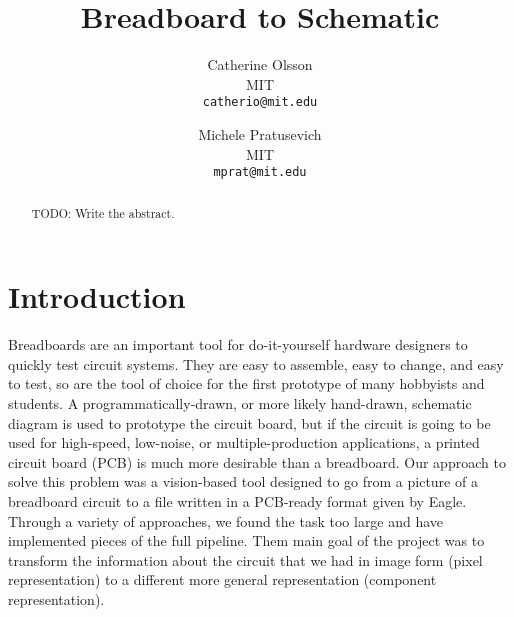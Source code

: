 \documentclass[10pt,twocolumn,letterpaper]{article}
\begin{document}
\title{Breadboard to Schematic}

\author{Catherine Olsson \\
MIT\\
{\tt\small catherio@mit.edu}
\and
Michele Pratusevich\\
MIT\\
{\tt\small mprat@mit.edu}
}

\maketitle
\thispagestyle{empty}

\begin{abstract}

TODO: Write the abstract.

\end{abstract}

\section{Introduction}

Breadboards are an important tool for do-it-yourself hardware designers to
quickly test circuit systems. They are easy to assemble, easy to change, and
easy to test, so are the tool of choice for the first prototype of many
hobbyists and students. A programmatically-drawn, or more likely hand-drawn,
schematic diagram is used to prototype the circuit board, but if the circuit is
going to be used for high-speed, low-noise, or multiple-production
applications, a printed circuit board (PCB) is much more desirable than a
breadboard. Our approach to solve this problem was a vision-based tool designed
to go from a picture of a breadboard circuit to a file written in a PCB-ready
format given by Eagle. Through a variety of approaches, we found the task too
large and have implemented pieces of the full pipeline. Them main goal of the
project was to transform the information about the circuit that we had in image
form (pixel representation) to a different more general representation
(component representation). 

\end{document}
